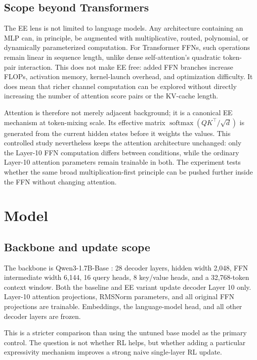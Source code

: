 \documentclass[10pt]{article}
\begin{document}
\subsection{Scope beyond Transformers}

The EE lens is not limited to language models.  Any architecture containing an
MLP can, in principle, be augmented with multiplicative, routed, polynomial, or
dynamically parameterized computation.  For Transformer FFNs, such operations
remain linear in sequence length, unlike dense self-attention's quadratic
token-pair interaction.  This does not make EE free: added FFN branches increase
FLOPs, activation memory, kernel-launch overhead, and optimization difficulty.
It does mean that richer channel computation can be explored without directly
increasing the number of attention score pairs or the KV-cache length.

Attention is therefore not merely adjacent background; it is a canonical EE
mechanism at token-mixing scale.  Its effective matrix
$\operatorname{softmax}(QK^\top/\sqrt{d})$ is generated from the current hidden
states before it weights the values.  This controlled study nevertheless keeps
the attention architecture unchanged: only the Layer-10 FFN computation
differs between conditions, while the ordinary Layer-10 attention parameters
remain trainable in both.  The experiment tests whether the same broad
multiplication-first principle can be pushed further inside the FFN without
changing attention.

\section{Model}

\subsection{Backbone and update scope}
\label{sec:backbone-scope}

The backbone is Qwen3-1.7B-Base \citep{yang2025qwen3}: 28 decoder layers,
hidden width 2,048, FFN intermediate width 6,144, 16 query heads, 8 key/value
heads, and a 32,768-token context window.  Both the baseline and EE variant
update decoder Layer 10 only.  Layer-10 attention projections, RMSNorm
parameters, and all original FFN projections are trainable.  Embeddings, the
language-model head, and all other decoder layers are frozen.

This is a stricter comparison than using the untuned base model as the primary
control.  The question is not whether RL helps, but whether adding a particular
expressivity mechanism improves a strong naive single-layer RL update.
\end{document}
